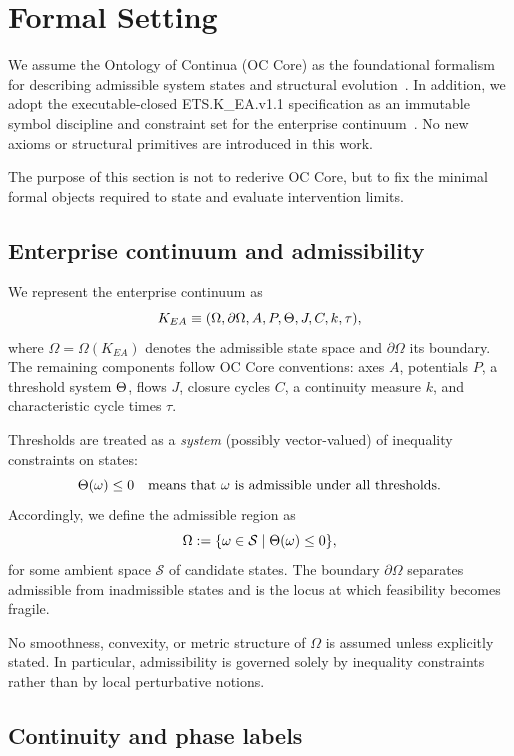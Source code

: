 ﻿\section{Formal Setting}

We assume the Ontology of Continua (OC Core) as the foundational formalism for
describing admissible system states and structural evolution~\cite{oc_core}.
In addition, we adopt the executable-closed ETS.K\_EA.v1.1 specification as an
immutable symbol discipline and constraint set for the enterprise continuum~\cite{ets_kea_v11}.
No new axioms or structural primitives are introduced in this work.

The purpose of this section is not to rederive OC Core, but to fix the minimal
formal objects required to state and evaluate intervention limits.

\subsection{Enterprise continuum and admissibility}

We represent the enterprise continuum as
\[
K_{EA} \equiv (\Omega,\partial\Omega, A, P, \Theta, J, C, k, \tau),
\]
where $\Omega=\Omega(K_{EA})$ denotes the admissible state space and
$\partial\Omega$ its boundary. The remaining components follow OC Core
conventions: axes $A$, potentials $P$, a threshold system $\Theta$, flows $J$,
closure cycles $C$, a continuity measure $k$, and characteristic cycle times
$\tau$.

Thresholds are treated as a \emph{system} (possibly vector-valued) of inequality
constraints on states:
\[
\Theta(\omega) \le 0
\quad \text{means that $\omega$ is admissible under all thresholds.}
\]
Accordingly, we define the admissible region as
\[
\Omega := \{\omega \in \mathcal{S} \mid \Theta(\omega)\le 0\},
\]
for some ambient space $\mathcal{S}$ of candidate states.
The boundary $\partial\Omega$ separates admissible from inadmissible states and
is the locus at which feasibility becomes fragile.

No smoothness, convexity, or metric structure of $\Omega$ is assumed unless
explicitly stated. In particular, admissibility is governed solely by inequality
constraints rather than by local perturbative notions.

\subsection{Continuity and phase labels}

